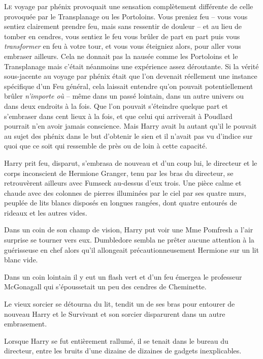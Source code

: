 
\lettrine{L}{e} voyage par phénix provoquait une sensation complètement différente de celle provoquée par le Transplanage ou les Portoloins. Vous preniez feu -- vous vous sentiez clairement prendre feu, mais sans ressentir de douleur -- et au lieu de tomber en cendres, vous sentiez le feu vous brûler de part en part puis vous \emph{transformer} en feu à votre tour, et vous vous éteigniez alors, pour aller vous embraser ailleurs. Cela ne donnait pas la nausée comme les Portoloins et le Transplanage mais c'était néanmoins une expérience assez déroutante. Si la vérité sous-jacente au voyage par phénix était que l'on devenait réellement une instance spécifique d'un Feu général, cela laissait entendre qu'on pouvait potentiellement brûler \emph{n'importe où} -- même dans un passé lointain, dans un autre univers ou dans deux endroits à la fois. Que l'on pouvait s'éteindre quelque part et s'embraser dans cent lieux à la fois, et que celui qui arriverait à Poudlard pourrait n'en avoir jamais conscience. Mais Harry avait lu autant qu'il le pouvait au sujet des phénix dans le but d'obtenir le sien et il n'avait pas vu d'indice sur quoi que ce soit qui ressemble de près ou de loin à cette capacité.

Harry prit feu, disparut, s'embrasa de nouveau et d'un coup lui, le directeur et le corps inconscient de Hermione Granger, tenu par les bras du directeur, se retrouvèrent ailleurs avec Fumseck au-dessus d'eux trois. Une pièce calme et chaude avec des colonnes de pierres illuminées par le ciel par ses quatre murs, peuplée de lits blancs disposés en longues rangées, dont quatre entourés de rideaux et les autres vides.

Dans un coin de son champ de vision, Harry put voir une Mme Pomfresh a l'air surprise se tourner vers eux. Dumbledore sembla ne prêter aucune attention à la guérisseuse en chef alors qu'il allongeait précautionneusement Hermione sur un lit blanc vide.

Dans un coin lointain il y eut un flash vert et d'un feu émergea le professeur McGonagall qui s'époussetait un peu des cendres de Cheminette.

Le vieux sorcier se détourna du lit, tendit un de ses bras pour entourer de nouveau Harry et le Survivant et son sorcier disparurent dans un autre embrasement.

\later

Lorsque Harry se fut entièrement rallumé, il se tenait dans le bureau du directeur, entre les bruits d'une dizaine de dizaines de gadgets inexplicables.

